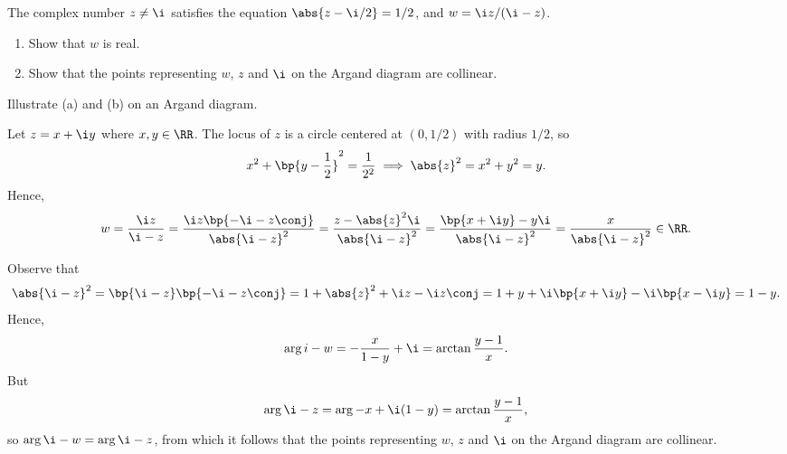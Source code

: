 \begin{problem}
    The complex number $z \neq \i$ satisfies the equation $\abs{z - \i/2} = 1/2$, and $w = \i z / (\i - z)$.
    \begin{enumerate}
        \item Show that $w$ is real.
        \item Show that the points representing $w$, $z$ and $\i$ on the Argand diagram are collinear.
    \end{enumerate}

    Illustrate (a) and (b) on an Argand diagram.
\end{problem}
\begin{solution}
    \begin{ppart}
        Let $z = x + \i y$ where $x, y \in \RR$. The locus of $z$ is a circle centered at $(0, 1/2)$ with radius $1/2$, so \[x^2 + \bp{y - \frac12}^2 = \frac1{2^2} \implies \abs{z}^2 = x^2 + y^2 = y.\] Hence, \[w = \frac{\i z}{\i - z} = \frac{\i z \bp{-\i - z\conj}}{\abs{\i - z}^2} = \frac{z - \abs{z}^2 \i}{\abs{\i - z}^2} = \frac{\bp{x + \i y} - y \i}{\abs{\i - z}^2} = \frac{x}{\abs{\i - z}^2} \in \RR.\]
    \end{ppart}
    \begin{ppart}
        Observe that \[\abs{\i - z}^2 = \bp{\i - z}\bp{-\i - z\conj} = 1 + \abs{z}^2 + \i z - \i z\conj = 1 + y + \i\bp{x + \i y} - \i \bp{x - \i y} = 1 - y.\] Hence, \[\arg{i - w} = -\frac{x}{1 - y} + \i = \arctan \frac{y-1}{x}.\] But \[\arg{\i-z} = \arg{-x + \i(1 - y)} = \arctan \frac{y-1}{x},\] so $\arg{\i - w} = \arg{\i - z}$, from which it follows that the points representing $w$, $z$ and $\i$ on the Argand diagram are collinear.
    \end{ppart}

    \begin{center}
\end{center}
\end{solution}
